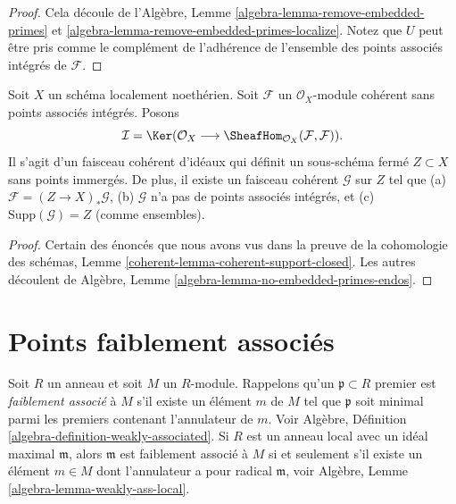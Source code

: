 \begin{proof}
Cela découle de l’Algèbre, Lemme  \ref{algebra-lemma-remove-embedded-primes}  et  \ref{algebra-lemma-remove-embedded-primes-localize}. Notez que
 $U$  peut être pris comme le complément de l’adhérence de l’ensemble des
points associés intégrés de  $\mathcal{F}$.
\end{proof}

\begin{lemma}
\label{lemma-no-embedded-points-endos}
Soit  $X$  un schéma localement noethérien. Soit  $\mathcal{F}$  un
 $\mathcal{O}_X$-module cohérent sans points associés intégrés. Posons
$$
\mathcal{I}
=
\Ker(\mathcal{O}_X
\longrightarrow
\SheafHom_{\mathcal{O}_X}(\mathcal{F}, \mathcal{F})).
$$
Il s’agit d’un faisceau cohérent d’idéaux qui définit un sous-schéma fermé
 $Z \subset X$  sans points immergés. De plus, il existe un faisceau cohérent
 $\mathcal{G}$  sur  $Z$  tel que (a)  $\mathcal{F} = (Z \to X)_*\mathcal{G}$, (b)  $\mathcal{G}$  n’a pas
de points associés intégrés, et (c)  $\text{Supp}(\mathcal{G}) = Z$  (comme ensembles).
\end{lemma}

\begin{proof}
Certain des énoncés que nous avons vus dans la preuve de la cohomologie des
schémas, Lemme  \ref{coherent-lemma-coherent-support-closed}. Les autres découlent de Algèbre, Lemme  \ref{algebra-lemma-no-embedded-primes-endos}.
\end{proof}



\section{Points faiblement associés}
\label{section-weakly-associated}

\noindent
Soit  $R$  un anneau et soit  $M$  un  $R$-module. Rappelons
qu'un  $\mathfrak p \subset R$  premier est  {\it  faiblement
associé}  à  $M$  s'il existe un élément  $m$  de
 $M$  tel que  $\mathfrak p$  soit minimal parmi les premiers contenant
l'annulateur de  $m$. Voir Algèbre, Définition  \ref{algebra-definition-weakly-associated}. Si
 $R$  est un anneau local avec un idéal maximal  $\mathfrak m$, alors
 $\mathfrak m$  est faiblement associé à  $M$  si et seulement s'il existe un
élément  $m \in M$  dont l'annulateur a pour radical  $\mathfrak m$, voir Algèbre,
Lemme  \ref{algebra-lemma-weakly-ass-local}.

